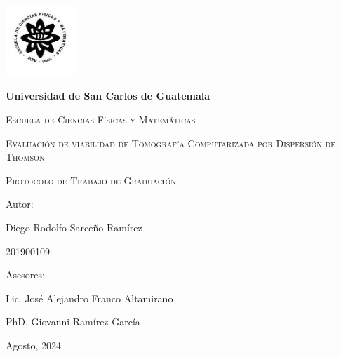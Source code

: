 \centering
{\includegraphics[width=0.2\textwidth]{img/index.jpg}\par}

\vspace{.5cm}
{\bfseries\LARGE Universidad de San Carlos de Guatemala \par}
\vspace{1cm}
{\scshape\Large Escuela de Ciencias Físicas y Matemáticas \par}
\vspace{2cm}
{\scshape\Huge Evaluación de viabilidad de Tomografía Computarizada por Dispersión de Thomson  \par}
\vspace{1cm}
{\scshape\LARGE Protocolo de Trabajo de Graduación \par}


\vspace{1cm}
\vfill
{\Large Autor: \par}
{\Large Diego Rodolfo Sarceño Ramírez \par}


{\Large 201900109 \par}
\vfill
\vfill
{\Large Asesores: \par}
{\Large Lic. José Alejandro Franco Altamirano \par}
{\Large PhD. Giovanni Ramírez García \par}



\vfill
{\Large Agosto, 2024 \par}